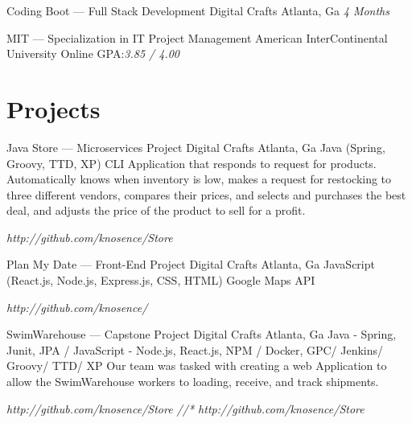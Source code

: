 \documentclass{resume-class/nadario_resume}
\begin{document}
        {Coding Boot --- Full Stack Development}
        {Digital Crafts}
        {Atlanta, Ga}
        {}{\textit{4 Months}}
        \vspace{.25cm}

        {MIT --- Specialization in IT Project Management}
        {American InterContinental University}
        {Online}
        {}{GPA:\textit{3.85 / 4.00}}
        \vspace{.25cm}

\section{Projects}
        {Java Store --- Microservices Project }
        {Digital Crafts}
        {Atlanta, Ga}
        {}{Java (Spring, Groovy, TTD, XP)}
          \indent CLI Application that responds to request for products. Automatically knows when
          inventory is low, makes a request for restocking to three different
          vendors, compares their prices, and selects and purchases the best
          deal, and adjusts the price of the product to sell for a profit.

        {}{\textit{http://github.com/knosence/Store}}
        \vspace{.25cm}

        {Plan My Date --- Front-End Project}
        {Digital Crafts}
        {Atlanta, Ga}
        {}{JavaScript (React.js, Node.js, Express.js, CSS, HTML) Google Maps API}
          \indent 

        {}{\textit{http://github.com/knosence/}}
        \vspace{.25cm}

        {SwimWarehouse --- Capstone Project}
        {Digital Crafts}
        {Atlanta, Ga}
        {}{Java - Spring, Junit, JPA / JavaScript - Node.js, React.js, NPM / Docker, 
        GPC/ Jenkins/ Groovy/ TTD/ XP}
          \indent Our team was tasked with creating a web Application to allow
          the SwimWarehouse workers to loading, receive, and track shipments. 

          {}{\textit{http://github.com/knosence/Store //* http://github.com/knosence/Store}}
\end{document}
